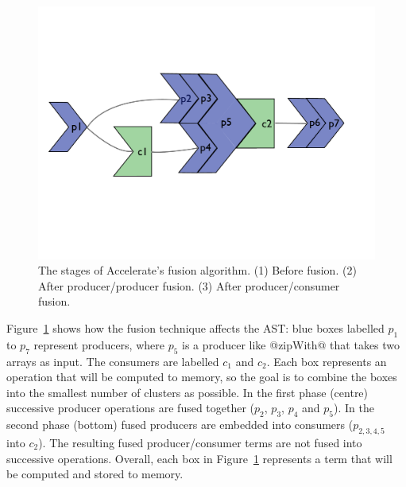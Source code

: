 \begin{figure}[htb]
    \centering  \includegraphics[scale=0.245]{images/opt/fusion3.pdf}
    \caption[Fusion in Accelerate]{The stages of Accelerate's fusion algorithm.
    (1) Before fusion.
    (2) After producer/producer fusion.
    (3) After producer/consumer fusion.}
    \label{fig:fusion}
\end{figure}

Figure~\ref{fig:fusion} shows how the fusion technique affects the
AST: blue boxes labelled $p_1$ to $p_7$ represent
producers, where $p_5$ is a producer like @zipWith@ that takes two arrays as
input. The consumers are labelled $c_1$ and $c_2$. Each box represents an
operation that will be computed to memory, so the goal is to combine the boxes
into the smallest number of clusters as possible.
In the first phase (centre) successive producer operations are fused together
($p_2$, $p_3$, $p_4$ and $p_5$). In the second phase (bottom) fused producers
are embedded into consumers ($p_{2,3,4,5}$ into $ c_2$). The resulting fused
producer/consumer terms are not fused into successive operations.
%
%
Overall, each box in Figure~\ref{fig:fusion} represents a term that will be
computed and stored to memory.

